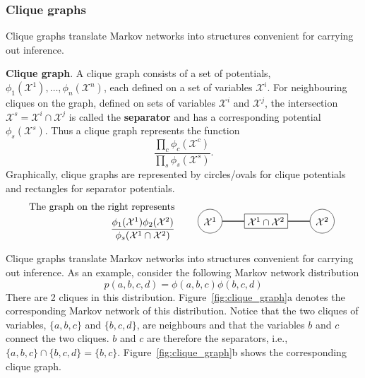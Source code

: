 \documentclass{article}
\begin{document}
\subsubsection{Clique graphs}
Clique graphs translate Markov networks into structures convenient for carrying out inference. 
\\
\begin{theorem}
    \textbf{Clique graph}. A clique graph consists of a set of potentials, $\phi_1(\mathcal{X}^1), \dots, \phi_n(\mathcal{X}^n)$, each defined on a set of variables $\mathcal{X}^i$. For neighbouring cliques on the graph, defined on sets of variables $\mathcal{X}^i$ and $\mathcal{X}^j$, the intersection $\mathcal{X}^s = \mathcal{X}^i \cap \mathcal{X}^j$ is called the \textbf{separator} and has a corresponding potential $\phi_s(\mathcal{X}^s)$. Thus a clique graph represents the function
    $$
        \frac{\prod_c \phi_c(\mathcal{X}^c)}{\prod_s \phi_s(\mathcal{X}^s)} .
    $$
    Graphically, clique graphs are represented by circles/ovals for clique potentials and rectangles for separator potentials. 
    \begin{equation*}
        \begin{aligned}
            \text{The graph on the right represents}\\ \frac{\phi_1(\mathcal{X}^1)\phi_2(\mathcal{X}^2)}{\phi_s(\mathcal{X}^1 \cap \mathcal{X}^2)}
        \end{aligned}
        \qquad
        \vcenter{\hbox{
        \begin{tikzpicture}
            \node[circle, draw] at (0, 0)   (xi) {$\mathcal{X}^1$};
            \node[circle, draw] at (4, 0)   (xj) {$\mathcal{X}^2$};
            \node[rectangle, draw] at (2, 0)   (sep) {$\mathcal{X}^1 \cap \mathcal{X}^2$};
            
            \draw [thick] (xi) -- (sep) node {};
            \draw [thick] (xj) -- (sep) node {};
        \end{tikzpicture}
        }}
    \end{equation*}
\end{theorem}

\noindent Clique graphs translate Markov networks into structures convenient for carrying out inference. As an example, consider the following Markov network distribution 
$$
    p(a, b, c, d) = \phi(a, b, c)\phi(b, c, d)
$$
\noindent There are 2 cliques in this distribution. Figure~\ref{fig:clique_graph}a denotes the corresponding Markov network of this distribution. Notice that the two cliques of variables, $\{a, b, c\}$ and $\{b, c, d\}$, are neighbours and that the variables $b$ and $c$ connect the two cliques. $b$ and $c$ are therefore the separators, i.e., $\{a, b, c\} \cap \{b, c, d\} = \{b, c\}$. Figure~\ref{fig:clique_graph}b shows the corresponding clique graph. 
\end{document}
